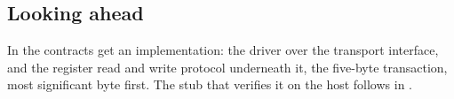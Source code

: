 \subsection*{Looking ahead}
In  the contracts get an implementation: the  driver over the transport
interface, and the register read and write protocol underneath it, the five-byte transaction, most
significant byte first. The stub that verifies it on the host follows in .
